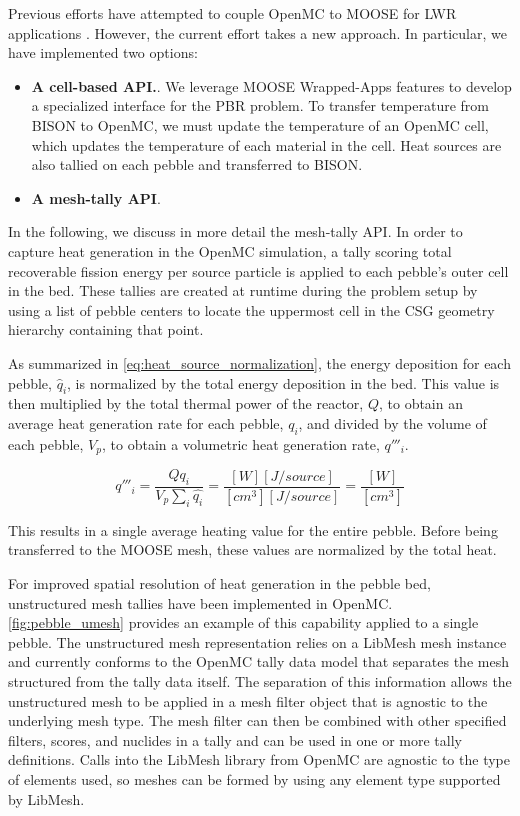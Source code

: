 Previous efforts have attempted to couple OpenMC to MOOSE for LWR applications \cite{ellis2017preliminary}.
However, the current effort takes a new approach. In particular, we have implemented two options:
\begin{itemize}
    \item \textbf{A cell-based API.}.  We leverage MOOSE Wrapped-Apps features to develop a specialized interface for the PBR problem. To transfer temperature from BISON to OpenMC, we must update the temperature of an OpenMC cell, which updates the temperature of each material in the cell. Heat sources are also tallied on each pebble and transferred to BISON.
    \item \textbf{A mesh-tally API}.
\end{itemize}

In the following, we discuss in more detail the mesh-tally API. In order to capture heat generation in the OpenMC simulation, a tally scoring total recoverable fission energy per source particle is applied to each pebble's outer cell in the bed. These tallies are created at runtime during the problem setup by using a list of pebble centers to locate the uppermost cell in the CSG geometry hierarchy containing that point.

As summarized in \autoref{eq:heat_source_normalization}, the energy deposition for each pebble, $\hat{q}_{i}$, is normalized by the total energy deposition in the bed.  This value is then multiplied by the total thermal power of the reactor, $Q$, to obtain an average heat generation rate for each pebble, $q_i$, and divided by the volume of each pebble, $V_p$, to obtain a volumetric heat generation rate, $q'''_i$.

\begin{equation}
    \label{eq:heat_source_normalization}
    q'''_i = \frac{Q q_i}{V_{p}\sum_{i}{\hat{q_i}}} = \frac{[W][J/source]}{[cm^{3}] [J/source]} = \frac{[W]}{[cm^{3}]}
\end{equation}

This results in a single average heating value for the entire pebble. Before being transferred to the MOOSE mesh, these values are normalized by the total heat.

For improved spatial resolution of heat generation in the pebble bed, unstructured mesh tallies have been implemented in OpenMC. \autoref{fig:pebble_umesh} provides an example of this capability applied to a single pebble. The unstructured mesh representation relies on a LibMesh mesh instance and currently conforms to the OpenMC tally data model that separates the mesh structured from the tally data itself. The separation of this information allows the unstructured mesh to be applied in a mesh filter object that is agnostic to the underlying mesh type. The mesh filter can then be combined with other specified filters, scores, and nuclides in a tally and can be used in one or more tally definitions. Calls into the LibMesh library from OpenMC are agnostic to the type of elements used, so meshes can be formed by using any element type supported by LibMesh.

